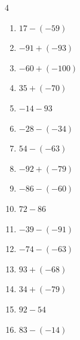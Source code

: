 \begin{multicols}{4}
\begin{enumerate}
  \item $17-(-59)$

        \phantom{$=76$}

  \item $-91+(-93)$

        \phantom{$=-184$}

  \item $-60+(-100)$

        \phantom{$=-160$}

  \item $35+(-70)$

        \phantom{$=-35$}

  \item $-14-93$

        \phantom{$=-107$}

  \item $-28-(-34)$

        \phantom{$=6$}

  \item $54-(-63)$

        \phantom{$=117$}

  \item $-92+(-79)$

        \phantom{$=-171$}

  \item $-86-(-60)$

        \phantom{$=-26$}

\columnbreak %

  \item $72-86$

        \phantom{$=-14$}

  \item $-39-(-91)$

        \phantom{$=52$}

  \item $-74-(-63)$

        \phantom{$=-11$}

  \item $93+(-68)$

        \phantom{$=25$}

  \item $34+(-79)$

        \phantom{$=-45$}

  \item $92-54$

        \phantom{$=38$}

  \item $83-(-14)$


\end{enumerate}
\end{multicols}

